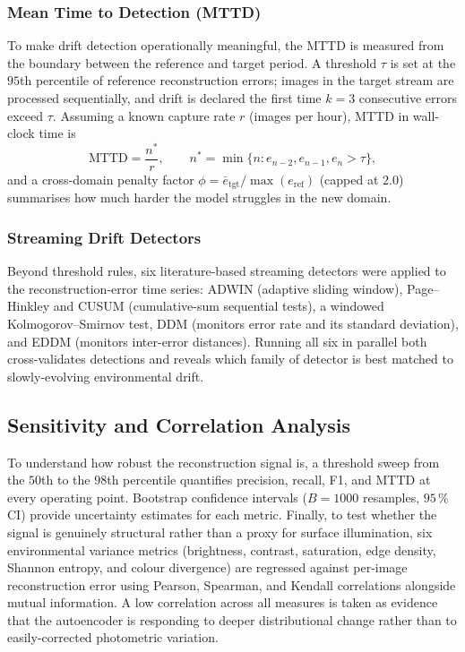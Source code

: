 \subsubsection{Mean Time to Detection (MTTD)}
To make drift detection operationally meaningful, the MTTD is measured from the
boundary between the reference and target period. A threshold $\tau$ is set at the
$95$th percentile of reference reconstruction errors; images in the target stream are
processed sequentially, and drift is declared the first time $k=3$ consecutive
errors exceed $\tau$. Assuming a known capture rate $r$ (images per hour), MTTD in
wall-clock time is
\begin{equation}
    \text{MTTD} = \frac{n^*}{r},\qquad
    n^* = \min\bigl\{n : e_{n-2},e_{n-1},e_n > \tau\bigr\},
    \label{eq:mttd}
\end{equation}
and a cross-domain penalty factor $\phi = \bar{e}_\text{tgt}/\max(e_\text{ref})$
(capped at $2.0$) summarises how much harder the model struggles in the new domain.

\subsubsection{Streaming Drift Detectors}
Beyond threshold rules, six literature-based streaming detectors were applied to the
reconstruction-error time series: ADWIN (adaptive sliding window), Page--Hinkley and
CUSUM (cumulative-sum sequential tests), a windowed Kolmogorov--Smirnov test,
DDM (monitors error rate and its standard deviation), and EDDM (monitors
inter-error distances). Running all six in parallel both cross-validates detections and
reveals which family of detector is best matched to slowly-evolving environmental
drift.

\subsection{Sensitivity and Correlation Analysis}

To understand how robust the reconstruction signal is, a threshold sweep from the
$50$th to the $98$th percentile quantifies precision, recall, F1, and MTTD at every
operating point. Bootstrap confidence intervals ($B=1000$ resamples, $95\,\%$ CI)
provide uncertainty estimates for each metric. Finally, to test whether the signal is
genuinely structural rather than a proxy for surface illumination, six environmental
variance metrics (brightness, contrast, saturation, edge density, Shannon entropy, and
colour divergence) are regressed against per-image reconstruction error using Pearson,
Spearman, and Kendall correlations alongside mutual information. A low correlation
across all measures is taken as evidence that the autoencoder is responding to deeper
distributional change rather than to easily-corrected photometric variation.


